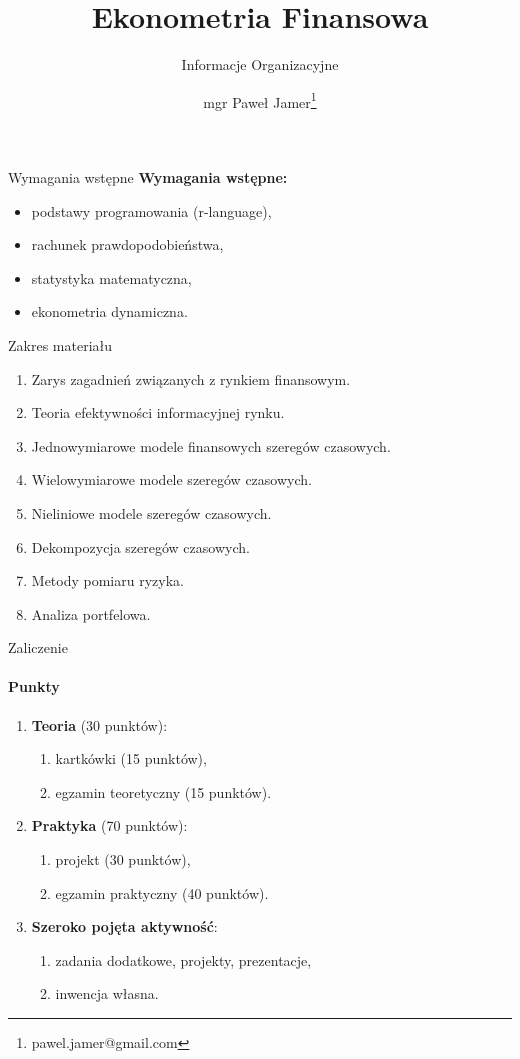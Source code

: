 \documentclass[a4paper, 11pt]{beamer}
\title{Ekonometria Finansowa}
\subtitle{Informacje Organizacyjne}
\author{mgr Paweł Jamer\thanks{pawel.jamer@gmail.com}}
\begin{document}
	\begin{frame}
		\titlepage
	\end{frame}

	\begin{frame}{Wymagania wstępne}
		\textbf{Wymagania wstępne:}
		\begin{itemize}
			\item podstawy programowania (r-language),
			\item rachunek prawdopodobieństwa,
			\item statystyka matematyczna,
			\item ekonometria dynamiczna.
		\end{itemize}
	\end{frame}
	
	\begin{frame}{Zakres materiału}
		\begin{enumerate}
			\item Zarys zagadnień związanych z rynkiem finansowym.
			\item Teoria efektywności informacyjnej rynku.
			\item Jednowymiarowe modele finansowych szeregów czasowych.
			\item Wielowymiarowe modele szeregów czasowych.
			\item Nieliniowe modele szeregów czasowych.
			\item Dekompozycja szeregów czasowych.
			\item Metody pomiaru ryzyka.
			\item Analiza portfelowa.
		\end{enumerate}
	\end{frame}

	\begin{frame}{Zaliczenie}
		\framesubtitle{Punkty}
		\begin{enumerate}
			\item \textbf{Teoria} (30 punktów):
			\begin{enumerate}
				\item kartkówki (15 punktów),
				\item egzamin teoretyczny (15 punktów).
			\end{enumerate}
			\item \textbf{Praktyka} (70 punktów):
			\begin{enumerate}
				\item projekt (30 punktów),
				\item egzamin praktyczny (40 punktów).
			\end{enumerate}
			\item \textbf{Szeroko pojęta aktywność}:
			\begin{enumerate}
				\item zadania dodatkowe, projekty, prezentacje,
				\item inwencja własna.
			\end{enumerate}
		\end{enumerate}
	\end{frame}
	
\end{document}
